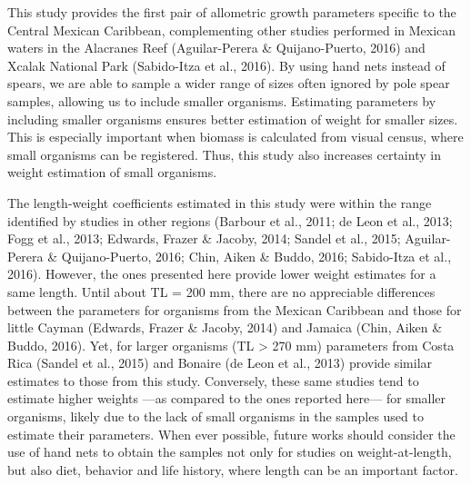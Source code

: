 \documentclass[12pt,]{article}
\begin{document}
This study provides the first pair of allometric growth parameters
specific to the Central Mexican Caribbean, complementing other studies
performed in Mexican waters in the Alacranes Reef (Aguilar-Perera \&
Quijano-Puerto, 2016) and Xcalak National Park (Sabido-Itza et al.,
2016). By using hand nets instead of spears, we are able to sample a
wider range of sizes often ignored by pole spear samples, allowing us to
include smaller organisms. Estimating parameters by including smaller
organisms ensures better estimation of weight for smaller sizes. This is
especially important when biomass is calculated from visual census,
where small organisms can be registered. Thus, this study also increases
certainty in weight estimation of small organisms.

The length-weight coefficients estimated in this study were within the
range identified by studies in other regions (Barbour et al., 2011; de
Leon et al., 2013; Fogg et al., 2013; Edwards, Frazer \& Jacoby, 2014;
Sandel et al., 2015; Aguilar-Perera \& Quijano-Puerto, 2016; Chin, Aiken
\& Buddo, 2016; Sabido-Itza et al., 2016). However, the ones presented
here provide lower weight estimates for a same length. Until about TL =
200 mm, there are no appreciable differences between the parameters for
organisms from the Mexican Caribbean and those for little Cayman
(Edwards, Frazer \& Jacoby, 2014) and Jamaica (Chin, Aiken \& Buddo,
2016). Yet, for larger organisms (TL \textgreater{} 270 mm) parameters
from Costa Rica (Sandel et al., 2015) and Bonaire (de Leon et al., 2013)
provide similar estimates to those from this study. Conversely, these
same studies tend to estimate higher weights ---as compared to the ones
reported here--- for smaller organisms, likely due to the lack of small
organisms in the samples used to estimate their parameters. When ever
possible, future works should consider the use of hand nets to obtain
the samples not only for studies on weight-at-length, but also diet,
behavior and life history, where length can be an important factor.
\end{document}
